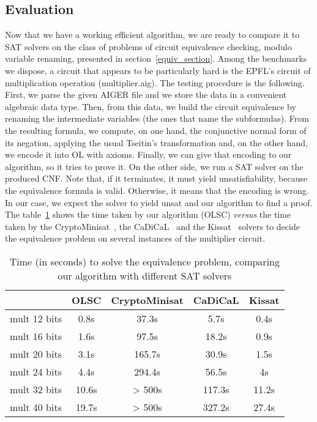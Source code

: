 \documentclass[a4paper, 11pt]{article}
\begin{document}
    \subsection{Evaluation}
    Now that we have a working efficient algorithm, we are ready to compare it to SAT solvers on the
    class of problems of circuit equivalence checking, modulo variable renaming, presented in 
    section~\ref{equiv_section}. Among the benchmarks we dispose, a circuit that appears to be
    particularly hard is the EPFL's circuit of multiplication operation (\textsf{multiplier.aig}). 
    The testing procedure is the
    following. First, we parse the given AIGER file and we store the data in a convenient algebraic
    data type. Then, from this data, we build the circuit equivalence by renaming the intermediate
    variables (the ones that name the subformulas). From the resulting formula, we compute, on one hand, 
    the conjunctive normal form of its negation, applying the usual Tseitin's transformation and, on 
    the other hand, we
    encode it into OL with axioms. Finally, we can give that encoding to our algorithm, so it tries
    to prove it. On the other side, we run a SAT solver on the produced CNF. Note that, if it terminates,
    it must yield unsatisfiability, because the equivalence formula is valid. Otherwise, it means that
    the encoding is wrong. 
    In our case, we expect the solver to yield unsat and our algorithm to find a proof.
    The table~\ref{benchmark_equiv} shows the time taken by our algorithm (OLSC) \textit{versus} the time
    taken by the CryptoMinisat~\cite{10.1007/978-3-642-02777-2_24},
    the CaDiCaL~\cite{BiereFallerFazekasFleuryFroleyks-CAV24} and the 
    Kissat~\cite{BiereFallerFazekasFleuryFroleyksPollitt-SAT-Competition-2024-solvers} solvers to decide 
    the equivalence problem on several instances of the multiplier circuit.
    \begin{table}[h] 
	    \begin{center}
		    \begin{tabular}{|c||c|c|c|c|}
			    \hline
			     &OLSC&CryptoMinisat&CaDiCaL&Kissat\\
			     \hline\hline
			     mult 12 bits&0.8s&37.3s&5.7s&0.4s\\
			     mult 16 bits&1.6s&97.5s&18.2s&0.9s\\
			     mult 20 bits&3.1s&165.7s&30.9s&1.5s\\
			     mult 24 bits&4.4s&294.4s&56.5s&4s\\
			     mult 32 bits&10.6s&> 500s&117.3s&11.2s\\
			     mult 40 bits&19.7s&> 500s&327.2s&27.4s\\
			     \hline
		    \end{tabular}
	    \end{center}
	    \caption{Time (in seconds) to solve the equivalence problem, comparing our algorithm with
	    different SAT solvers}
	    \label{benchmark_equiv}
    \end{table}
\end{document}
